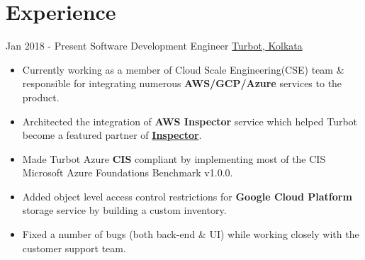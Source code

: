 \documentclass[a4paper]{twentysecondcv} %
\begin{document}
\makeprofile %


\section{Experience}

\begin{twenty} %
\twentyitem
    	{Jan 2018 -}
		{Present}
        {Software Development Engineer}
        {\href{https://www.turbot.com/}{Turbot, Kolkata}}
        {}
        {\begin{itemize}
        \item Currently working as a member of Cloud Scale Engineering(CSE) team \& responsible for integrating numerous \textbf{AWS/GCP/Azure} services to the product.
        
        \item Architected the integration of \textbf{AWS Inspector} service which helped Turbot become a featured partner of \href{https://aws.amazon.com/inspector/partners/}{\textbf{Inspector}}.
        
        \item Made Turbot Azure \textbf{CIS} compliant by implementing most of the CIS Microsoft Azure Foundations Benchmark v1.0.0.
        
        \item Added object level access control restrictions for \textbf{Google Cloud Platform} storage service by building a custom inventory.
        
        \item Fixed a number of bugs (both back-end \& UI) while working closely with the customer support team.
        

\end{itemize}}
\end{twenty}
\end{document}
